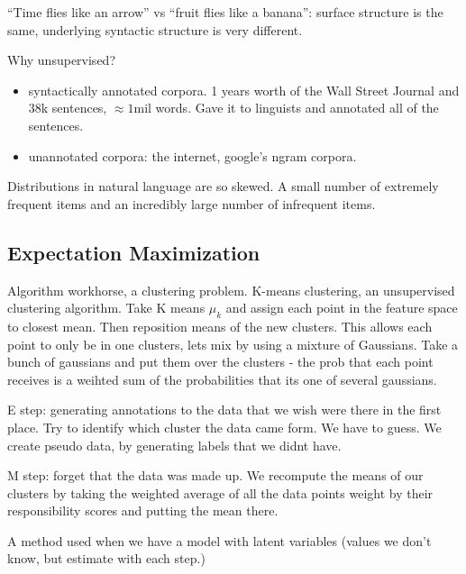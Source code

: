 \documentclass[]{article}
\begin{document}
``Time flies like an arrow'' vs ``fruit flies like a banana'': surface structure is the same, underlying syntactic structure is very different. 

Why unsupervised?
\begin{itemize}
	\item syntactically annotated corpora. 1 years worth of the Wall Street Journal and 38k sentences, $\approx 1$mil words. Gave it to linguists and annotated all of the sentences.
	\item unannotated corpora: the internet, google's ngram corpora.
\end{itemize}

Distributions in natural language are so skewed. A small number of extremely frequent items and an incredibly large number of infrequent items. 

\subsection{Expectation Maximization}

Algorithm workhorse, a clustering problem. K-means clustering, an unsupervised clustering algorithm. Take K means $\mu_{k}$ and assign each point in the feature space to closest mean. Then reposition means of the new clusters. This allows each point to only be in one clusters, lets mix by using a mixture of Gaussians. Take a bunch of gaussians and put them over the clusters - the prob that each point receives is a weihted sum of the probabilities that its one of several gaussians.

E step: generating annotations to the data that we wish were there in the first place. Try to identify which cluster the data came form. We have to guess. We create pseudo data, by generating labels that we didnt have.

M step: forget that the data was made up. We recompute the means of our clusters by taking the weighted average of all the data points weight by their responsibility scores and putting the mean there. 

A method used when we have a model with latent variables (values we don't know, but estimate with each step.)
\end{document}
